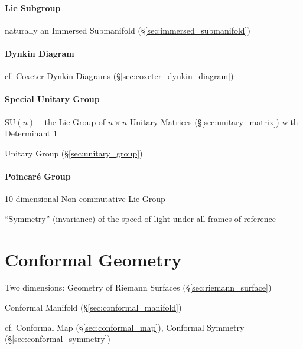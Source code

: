 \paragraph{Lie Subgroup}\label{sec:lie_subgroup}\hfill

naturally an Immersed Submanifold (\S\ref{sec:immersed_submanifold})



\paragraph{Dynkin Diagram}\label{sec:dynkin_diagram}\hfill

cf. Coxeter-Dynkin Diagrams (\S\ref{sec:coxeter_dynkin_diagram})



\paragraph{Special Unitary Group}\label{sec:special_unitary}\hfill

$\mathrm{SU}(n)$ -- the Lie Group of $n \times n$ Unitary Matrices
(\S\ref{sec:unitary_matrix}) with Determinant $1$

Unitary Group (\S\ref{sec:unitary_group})



\paragraph{Poincar\'e Group}\label{sec:poincare_group}\hfill

10-dimensional Non-commutative Lie Group

``Symmetry'' (invariance) of the speed of light under all frames of reference



\section{Conformal Geometry}\label{sec:conformal_geometry}

Two dimensions: Geometry of Riemann Surfaces
(\S\ref{sec:riemann_surface})

\fist Conformal Manifold (\S\ref{sec:conformal_manifold})

cf. Conformal Map (\S\ref{sec:conformal_map}),
Conformal Symmetry (\S\ref{sec:conformal_symmetry})



